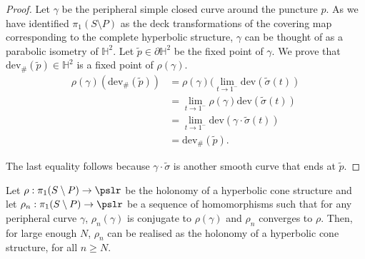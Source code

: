 \begin{proof}
	Let $\gamma$ be the peripheral simple closed curve around the puncture $p$. As we have identified $\pi_1(S \setminus P)$ as the deck transformations of the covering map corresponding to the complete hyperbolic structure,  $\gamma$ can be thought of as a parabolic isometry of $\mathbb{H}^2$. Let $\tilde{p} \in \partial \mathbb{H}^2$ be the fixed point of $\gamma$. We prove that $\text{dev}_{\#}(\tilde{p}) \in \mathbb{H}^2$ is a fixed point of $\rho(\gamma)$.
	\begin{align*}
			\rho(\gamma)(\text{dev}_{\#}(\tilde{p})) &= \rho(\gamma)(\lim_{t \rightarrow 1^-} \text{dev}(\tilde{\sigma}(t)) \\ 
			&= \lim_{t \rightarrow 1^{-}} \rho(\gamma) \text{dev}(\tilde{\sigma}(t))\\ 
			&= \lim_{t \rightarrow 1^{-}} \text{dev}(\gamma \cdot \tilde{\sigma}(t))\\ 
			&= \text{dev}_{\#}(\tilde{p}).
	\end{align*}

	
	The last equality follows because $\gamma \cdot \tilde{\sigma}$ is another smooth curve that ends at $\tilde{p}$. 
\end{proof}

\begin{theorem}\label{thm:holonomies_are_open}
	Let $\rho: \pi_1(S \setminus P) \rightarrow \pslr$ be the holonomy of a hyperbolic cone structure and let $\rho_n : \pi_1(S \setminus P) \rightarrow \pslr$ be a sequence of homomorphisms such that for any peripheral curve $\gamma$, $\rho_n(\gamma)$ is conjugate to $\rho(\gamma)$ and $\rho_n$ converges to $\rho$. Then, for large enough $N$, $\rho_n$ can be realised as the holonomy of a hyperbolic cone structure, for all $n \geq N$. 
\end{theorem}

